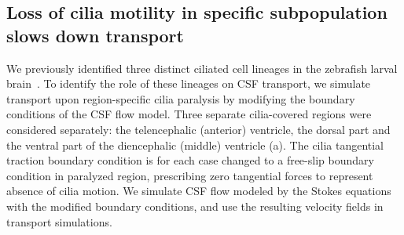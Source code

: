 \documentclass[fleqn]{wlscirep}
\begin{document}
\subsection*{Loss of cilia motility in specific subpopulation slows down transport}
We previously identified three distinct ciliated cell lineages in the
zebrafish larval brain~\cite{Olstad2019CiliaryDevelopment, DGama2025MotileBrain}.
To identify the role of these lineages on CSF transport, we simulate transport
upon region-specific cilia paralysis by modifying the boundary conditions
of the CSF flow model. Three separate cilia-covered regions were considered separately:
the telencephalic (anterior) ventricle, the dorsal part and the ventral part
of the diencephalic (middle) ventricle (a).
The cilia tangential traction boundary condition is for each case
changed to a free-slip boundary condition in paralyzed region,
prescribing zero tangential forces to
represent absence of cilia motion.
We simulate CSF flow modeled by the Stokes equations with the
modified boundary conditions, and use the resulting
velocity fields in transport simulations.
\end{document}
